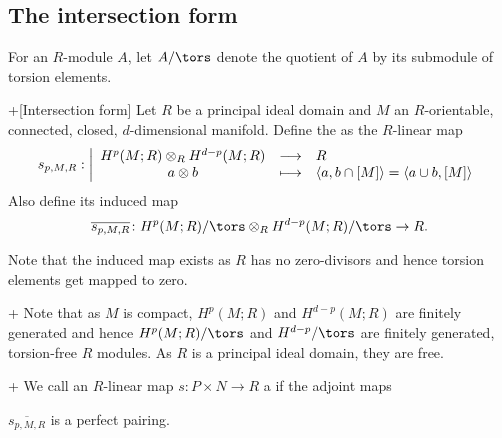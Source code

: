 \subsection{The intersection form}

\begin{notation}
  For an $R$-module  $A$, let  $A/\tors$ denote the quotient
  of $A$ by its submodule of torsion elements.
\end{notation}

\begin{definition}+[Intersection form]
  \label{def:intersection-form}
  Let $R$ be a  principal ideal domain and $M$ an  $R$-orientable,
  connected, closed,  $d$-dimensional manifold. 
  Define the  as the $R$-linear map 
    \begin{equation*}
    s_{p,M,R}: \left| \begin{array}{c c l} 
    H^p(M;R) \otimes _R H^{d-p}(M;R) & \longrightarrow & R \\
    a \otimes b& \longmapsto &  \left< a, b \cap [M] \right>
    = \left< a\cup b, [M] \right> 
    \end{array} \right.
  \end{equation*}
  Also define its induced map
  \[
    \overline{s_{p,M,R}}\colon  H^p(M;R)/\tors \otimes _R H^{d-p}(M;R)/\tors
    \to 
    R
  .\] 
\end{definition}
\begin{well-definedness}
  Note that the induced map exists as $R$ has no zero-divisors
  and hence torsion elements get mapped to zero.
\end{well-definedness}

\begin{remark}+
  Note that as $M$ is compact,  $H^p(M;R)$ and  $H^{d-p}(M;R)$ 
  are finitely generated and hence $H^p(M;R) / \tors$ and
  $H^{d-p} / \tors$ are finitely generated, torsion-free $R$ modules.
  As  $R$ is a  principal ideal domain, they are free.
\end{remark}

\begin{definition}+
  We call an $R$-linear map  $s\colon P\times N \to R$ a 
  if the adjoint maps
\end{definition}

\begin{lemma}
  \label{lm:intersection-pairing-is-perfect-pairing}
  $\overline{s_{p,M,R}}$ is a perfect pairing.
\end{lemma}
